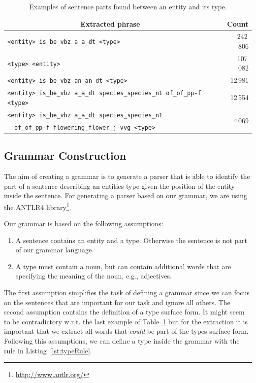 \begin{table}
\centering
\begin{tabular}{lp{5mm}r}
 \toprule
 \multicolumn{1}{c}{\textbf{Extracted phrase}} && \multicolumn{1}{c}{\textbf{Count}} \\
 \midrule
 \texttt{<entity> is\_be\_vbz a\_a\_dt <type>} && 242\,806 \\
 \texttt{<type> <entity>} && 107\,082 \\
 \texttt{<entity> is\_be\_vbz an\_an\_dt <type>} && 12\,981 \\
 \texttt{<entity> is\_be\_vbz a\_a\_dt species\_species\_n1 of\_of\_pp-f <type>} && 12\,554 \\
 \texttt{<entity> is\_be\_vbz a\_a\_dt species\_species\_n1} && \multirow{2}{*}{4\,069} \\ 
 \qquad\qquad\ \ \texttt{of\_of\_pp-f flowering\_flower\_j-vvg <type>} && \\
 \bottomrule
\end{tabular}
\caption{Examples of sentence parts found between an entity and its type.}
\label{tab:extParts}
\end{table}

\subsection{Grammar Construction}
\label{sec:grammar}

The aim of creating a grammar is to generate a parser that is able to identify the part of a sentence describing an entities type given the position of the entity inside the sentence.
For generating a parser based on our grammar, we are using the ANTLR4 library\footnote{\url{http://www.antlr.org/}}.

Our grammar is based on the following assumptions:
\begin{enumerate}
\item A sentence contains an entity and a type. Otherwise the sentence is not part of our grammar language.
\item A type must contain a noun, but can contain additional words that are specifying the meaning of the noun, e.g., adjectives.
\end{enumerate}

The first assumption simplifies the task of defining a grammar since we can focus on the sentences that are important for our task and ignore all others.
The second assumption contains the definition of a type surface form.
It might seem to be contradictory w.r.t. the last example of Table~\ref{tab:extParts} but for the extraction it is important that we extract all words that \emph{could} be part of the types surface form.
Following this assumptions, we can define a type inside the grammar with the rule in Listing~\ref{lst:typeRule}.

